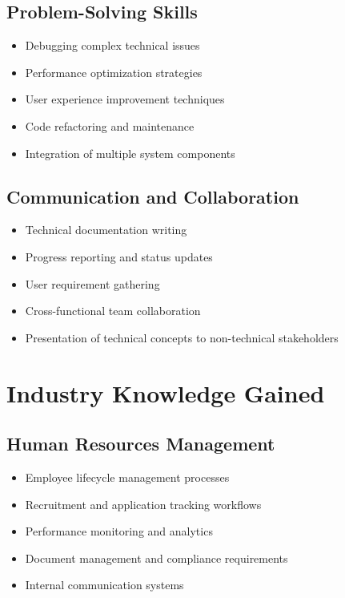 \subsection{Problem-Solving Skills}
\begin{itemize}
    \item Debugging complex technical issues
    \item Performance optimization strategies
    \item User experience improvement techniques
    \item Code refactoring and maintenance
    \item Integration of multiple system components
\end{itemize}

\subsection{Communication and Collaboration}
\begin{itemize}
    \item Technical documentation writing
    \item Progress reporting and status updates
    \item User requirement gathering
    \item Cross-functional team collaboration
    \item Presentation of technical concepts to non-technical stakeholders
\end{itemize}

\section{Industry Knowledge Gained}

\subsection{Human Resources Management}
\begin{itemize}
    \item Employee lifecycle management processes
    \item Recruitment and application tracking workflows
    \item Performance monitoring and analytics
    \item Document management and compliance requirements
    \item Internal communication systems
\end{itemize}

